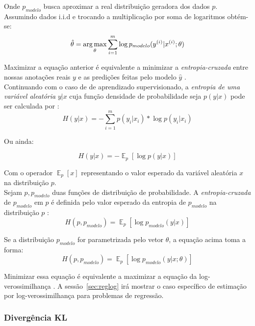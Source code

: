 Onde $p_{modelo}$ busca aproximar a real distribuição geradora dos dados $p$. Assumindo dados i.i.d e trocando a multiplicação por soma de logaritmos obtém-se: \\

\[ \hat{\theta} = \operatorname*{arg\,max}_{\theta} \sum_{i=1}^{m} \log p_{modelo}(y^{(i)}| x^{(i)};\theta) \]

Maximizar a equação anterior é equivalente a minimizar a \textit{entropia-cruzada} entre
nossas anotações reais $y$ e as predições feitas pelo modelo $\hat{y}$
\citep{dlbook}. \\

Continuando com o caso de de aprendizado supervisionado, a \textit{entropia de uma variável aleatória} $y | x$ cuja função densidade
de probabilidade seja $p(y | x)$ pode ser calculada por \citep{shannon2001mathematical}: \\

\[ H(y | x)  = - \sum^m_{i=1} p(y_i | x_i)*\log p(y_i | x_i) \]

Ou ainda:

\[H(y | x) = - \mathop{\mathbb{E}}_p[\log p(y | x)] \]

Com o operador $\mathop{\mathbb{E}}_p[x]$ representando o valor esperado da
variável aleatória $x$ na distribuição $p$. \\

Sejam $p,p_{modelo}$ duas funções de distribuição de probabilidade. A \textit{entropia-cruzada} de $p_{modelo}$ em $p$ é definida pelo valor
esperado da entropia de $p_{modelo}$ na distribuição $p$ \citep{bayesml}: \\

\[H(p,p_{modelo}) =  \mathop{\mathbb{E}}_p[\log p_{modelo}(y | x)] \]

Se a distribuição $p_{modelo}$ for parametrizada pelo vetor $\theta$, a equação
acima toma a forma: \\


\[H(p,p_{modelo}) =  \mathop{\mathbb{E}}_p[\log p_{modelo}(y | x ; \theta)] \]

Minimizar essa equação é equivalente a maximizar a equação da
log-verossimilhança \citep{dlbook}. A sessão~\ref{sec:reglog} irá mostrar o caso
específico de estimação por log-verossimilhança para problemas de regressão.  



\subsubsection{Divergência KL}

